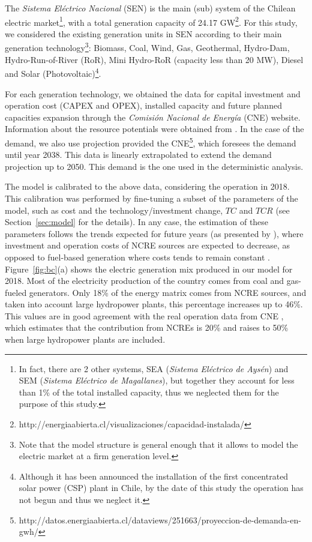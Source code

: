\documentclass[11pt, letterpaper]{article}
\begin{document}
The \textit{Sistema El\'ectrico Nacional} (SEN) is the main (sub) system of the Chilean electric market\footnote{In fact, there are 2 other systems, SEA (\textit{Sistema El\'ectrico de Ays\'en}) and SEM (\textit{Sistema El\'ectrico de Magallanes}), but together they account  for less than 1\% of the total installed capacity, thus we neglected them for the purpose of this study.},  with a total generation capacity of 24.17 GW\footnote{http://energiaabierta.cl/visualizaciones/capacidad-instalada/}. For this study, we considered the existing generation units in SEN according to their main generation technology\footnote{Note that the model structure is general enough that it allows to model the electric market at a firm generation level.}: Biomass, Coal, Wind, Gas, Geothermal, Hydro-Dam, Hydro-Run-of-River (RoR), Mini Hydro-RoR (capacity less than 20 MW), Diesel and Solar (Photovoltaic)\footnote{ Although it has been announced the installation of the first concentrated solar power (CSP) plant in Chile, by the date of this study the operation has not begun and thus we neglect it. }.

\smallskip

For each generation technology, we obtained the data for capital investment and operation cost (CAPEX and OPEX), installed capacity and future planned capacities expansion through the \textit{Comisi\'on Nacional de Energ\'ia} (CNE) website. Information about the resource potentials were obtained from \cite{Santana2014potencial}.
In the case of the demand, we also use projection provided the CNE\footnote{http://datos.energiaabierta.cl/dataviews/251663/proyeccion-de-demanda-en-gwh/}, which foresees the demand until year 2038. This data is linearly extrapolated to extend the demand projection up to 2050. This demand  is the one used in the deterministic analysis.

\smallskip

The model is calibrated to the above data, considering the operation in 2018. This calibration was performed by fine-tuning a subset of the parameters of the model, such as cost and the technology/investment change, $TC$ and $TCR$ (see Section~\ref{sec:model} for the details). In any case, the estimation of these parameters follows the trends expected for future years (as presented by \cite{Mena2019csp,NRELcosts}), where investment and operation costs of NCRE sources are expected to decrease, as opposed to fuel-based generation where costs tends to remain constant \cite{Mena2019csp,NRELcosts}.
Figure~\ref{fig:bc}(a) shows the electric generation mix produced in our model for 2018. Most of the electricity production of the country comes from coal and gas-fueled generators. Only 18\% of the energy matrix comes from NCRE sources, and taken into account large hydropower plants, this percentage increases up to  46\%. This values are in good agreement with the real operation data from CNE \cite{CNE2018}, which estimates that the contribution from NCREs is 20\% and raises to 50\% when large hydropower plants are included. 
\end{document}
